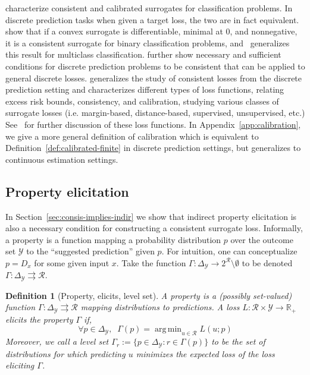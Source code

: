 \documentclass{article}
\newcommand{\reals}{\mathbb{R}}
\newcommand{\simplex}{\Delta_\Y}
\newcommand{\R}{\mathcal{R}}
\newcommand{\Y}{\mathcal{Y}}
\newcommand{\toto}{\rightrightarrows}
\newtheorem{definition}{Definition}
\DeclareMathOperator*{\argmin}{arg\,min}
\begin{document}
\cite{zhang2004statistical,lin2004note,bartlett2006convexity,tewari2007consistency} characterize consistent and calibrated surrogates for classification problems.
In discrete prediction tasks when given a target loss, the two are in fact equivalent.  
\cite{bartlett2006convexity} show that if a convex surrogate is differentiable, minimal at $0$, and nonnegative, it is a consistent surrogate for binary classification problems, and~\cite{tewari2007consistency} generalizes this result for multiclass classification. 
\cite{ramaswamy2016convex} further show necessary and sufficient conditions for discrete prediction problems to be consistent that can be applied to general discrete losses.
\cite{steinwart2007compare} generalizes the study of consistent losses from the discrete prediction setting and characterizes different types of loss functions, relating excess risk bounds, consistency, and calibration, studying various classes of surrogate losses (i.e. margin-based, distance-based, supervised, unsupervised, etc.)
See~\cite[Chapter 2]{steinwart2008support} for further discussion of these loss functions.
In Appendix~\ref{app:calibration}, we give a more general definition of calibration which is equivalent to Definition~\ref{def:calibrated-finite} in discrete prediction settings, but generalizes to continuous estimation settings.


\subsection{Property elicitation}\label{subsec:properties}
In Section~\ref{sec:consis-implies-indir} we show that indirect property elicitation is also a necessary condition for constructing a consistent surrogate loss.
Informally, a property is a function mapping a probability distribution $p$ over the outcome set $\Y$ to the ``suggested prediction'' given $p$.
For intuition, one can conceptualize $p = D_x$ for some given input $x$.
Take the function  $\Gamma: \simplex \to 2^\R \setminus \emptyset$ to be denoted $\Gamma:\simplex \toto \R$.
\begin{definition}[Property, elicits, level set]
	A \emph{property} is a (possibly set-valued) function $\Gamma : \simplex \toto \R$ mapping distributions to predictions.
	A loss $L : \R \times \Y \to \reals_+$ \emph{elicits} the property $\Gamma$ if,
	\begin{equation}
	\forall p \in \simplex, \;\; \Gamma(p) = \argmin_{u \in \R}L(u;p)
	\end{equation}
	Moreover, we call a \emph{level set} $\Gamma_r := \{p \in \simplex : r \in \Gamma(p)\}$ to be the set of distributions for which predicting $u$ minimizes the expected loss of the loss eliciting $\Gamma$.
\end{definition}
\end{document}
